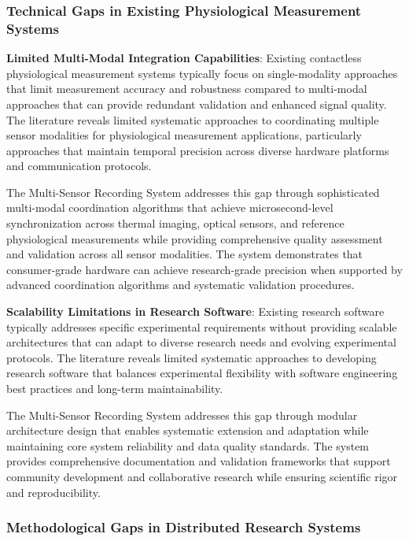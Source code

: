 \documentclass[12pt,a4paper]{report}
\begin{document}
\subsubsection{Technical Gaps in Existing Physiological Measurement Systems}

\textbf{Limited Multi-Modal Integration Capabilities}: Existing contactless physiological measurement systems typically focus
on single-modality approaches that limit measurement accuracy and robustness compared to multi-modal approaches that can
provide redundant validation and enhanced signal quality. The literature reveals limited systematic approaches to
coordinating multiple sensor modalities for physiological measurement applications, particularly approaches that
maintain temporal precision across diverse hardware platforms and communication protocols.

The Multi-Sensor Recording System addresses this gap through sophisticated multi-modal coordination algorithms that
achieve microsecond-level synchronization across thermal imaging, optical sensors, and reference physiological
measurements while providing comprehensive quality assessment and validation across all sensor modalities. The system
demonstrates that consumer-grade hardware can achieve research-grade precision when supported by advanced coordination
algorithms and systematic validation procedures.

\textbf{Scalability Limitations in Research Software}: Existing research software typically addresses specific experimental
requirements without providing scalable architectures that can adapt to diverse research needs and evolving experimental
protocols. The literature reveals limited systematic approaches to developing research software that balances
experimental flexibility with software engineering best practices and long-term maintainability.

The Multi-Sensor Recording System addresses this gap through modular architecture design that enables systematic
extension and adaptation while maintaining core system reliability and data quality standards. The system provides
comprehensive documentation and validation frameworks that support community development and collaborative research
while ensuring scientific rigor and reproducibility.

\subsubsection{Methodological Gaps in Distributed Research Systems}
\end{document}
